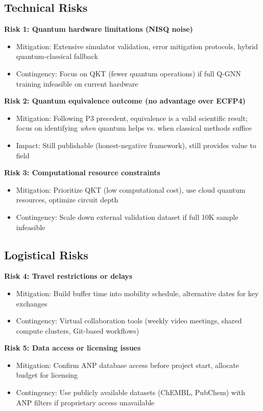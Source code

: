 \documentclass[11pt,a4paper]{article}
\begin{document}
\subsection{Technical Risks}

\textbf{Risk 1: Quantum hardware limitations (NISQ noise)}
\begin{itemize}
    \item Mitigation: Extensive simulator validation, error mitigation protocols, hybrid quantum-classical fallback
    \item Contingency: Focus on QKT (fewer quantum operations) if full Q-GNN training infeasible on current hardware
\end{itemize}

\textbf{Risk 2: Quantum equivalence outcome (no advantage over ECFP4)}
\begin{itemize}
    \item Mitigation: Following P3 precedent, equivalence is a valid scientific result; focus on identifying \textit{when} quantum helps vs. when classical methods suffice
    \item Impact: Still publishable (honest-negative framework), still provides value to field
\end{itemize}

\textbf{Risk 3: Computational resource constraints}
\begin{itemize}
    \item Mitigation: Prioritize QKT (low computational cost), use cloud quantum resources, optimize circuit depth
    \item Contingency: Scale down external validation dataset if full 10K sample infeasible
\end{itemize}

\subsection{Logistical Risks}

\textbf{Risk 4: Travel restrictions or delays}
\begin{itemize}
    \item Mitigation: Build buffer time into mobility schedule, alternative dates for key exchanges
    \item Contingency: Virtual collaboration tools (weekly video meetings, shared compute clusters, Git-based workflows)
\end{itemize}

\textbf{Risk 5: Data access or licensing issues}
\begin{itemize}
    \item Mitigation: Confirm ANP database access before project start, allocate budget for licensing
    \item Contingency: Use publicly available datasets (ChEMBL, PubChem) with ANP filters if proprietary access unavailable
\end{itemize}
\end{document}
